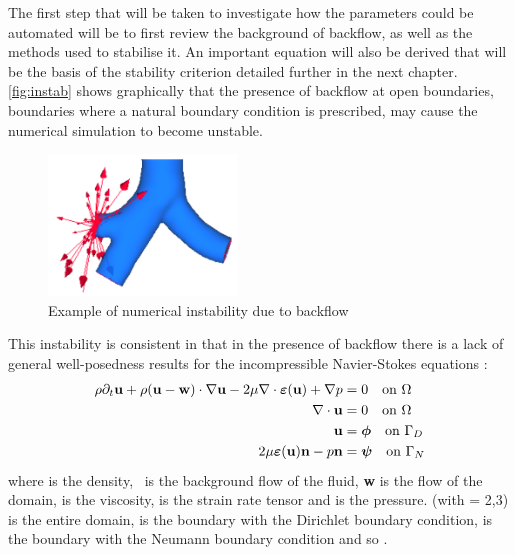 
The first step that will be taken to investigate how the parameters could be automated will be to first review the background of backflow, as well as the methods used to stabilise it. An important equation will also be derived that will be the basis of the stability criterion detailed further in the next chapter.\\

\autoref{fig:instab} shows graphically that the presence of backflow at open boundaries, boundaries where a natural boundary condition is prescribed, may cause the numerical simulation to become unstable.
\begin{figure}[t]
\centering
\includegraphics[width=5cm]{media/instability.PNG}
\caption{Example of numerical instability due to backflow\label{fig:instab}}
\end{figure}
This instability is consistent in that in the presence of backflow there is a lack of general well-posedness results for the incompressible Navier-Stokes equations \cite[429--430]{alfioquarteroni2014}: \begin{align}\label{eq:NSeq}\begin{split}
 \rho\partial_t{\textbf{u}} + \rho({\textbf{u}} - \textbf{w})\cdot\nabla{\textbf{u}} - 2\mu\nabla\cdot\bm{\varepsilon}({\textbf{u}}) + \nabla p &= 0\quad\text{on}~\Omega \\ \nabla\cdot{\textbf{u}} &= 0\quad\text{on}~\Omega \\
 {\textbf{u}} &= \bm{\phi}\quad\text{on}~\Gamma_D\\
 2\mu\bm{\varepsilon}({\textbf{u}}){\textbf{n}} - p{\textbf{n}} &= \bm{\psi}\quad\text{on}~\Gamma_N
 \end{split}\end{align}
 where \mathm{\rho} is the density, \bmu~is the background flow of the fluid, \textbf{w} is the flow of the domain, \mathm{\mu} is the viscosity,  is the strain rate tensor and  is the pressure. (with  = 2,3) is the entire domain,  is the boundary with the Dirichlet boundary condition,  is the boundary with the Neumann boundary condition and so . 
 
